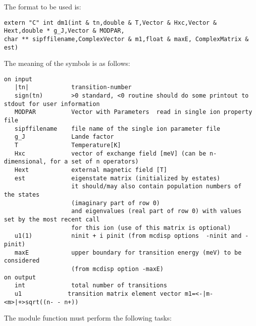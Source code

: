 The format to be used is:
{\footnotesize
\begin{verbatim}
extern "C" int dm1(int & tn,double & T,Vector & Hxc,Vector & Hext,double * g_J,Vector & MODPAR,
char ** sipffilename,ComplexVector & m1,float & maxE, ComplexMatrix & est)
\end{verbatim}

The meaning of the symbols is as follows:

\begin{verbatim}
on input
   |tn|            transition-number  
   sign(tn)        >0 standard, <0 routine should do some printout to stdout for user information
   MODPAR          Vector with Parameters  read in single ion property file
   sipffilename    file name of the single ion parameter file
   g_J             Lande factor
   T               Temperature[K]
   Hxc             vector of exchange field [meV] (can be n-dimensional, for a set of n operators)
   Hext            external magnetic field [T]
   est             eigenstate matrix (initialized by estates)
                   it should/may also contain population numbers of the states
				   (imaginary part of row 0)
                   and eigenvalues (real part of row 0) with values set by the most recent call
				   for this ion (use of this matrix is optional)
   u1(1)           ninit + i pinit (from mcdisp options  -ninit and -pinit)
   maxE            upper boundary for transition energy (meV) to be considered
                   (from mcdisp option -maxE)
on output
   int             total number of transitions
   u1             transition matrix element vector m1=<-|m-<m>|+>sqrt((n- - n+))                          
\end{verbatim}
}
The module function must perform the following tasks:
